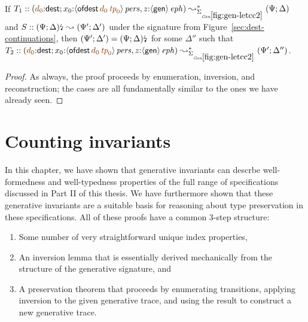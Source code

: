 \bigskip
\begin{theorem} ~
  \label{thm:siggenletcc}
  \smallskip

  If $T_1 :: \left(\lf{d_0}{:}{\sf dest}; x_0{:}\ispers{\susp{{\sf
          ofdest}\,\lf{d_0}\,\lf{{\it tp}_0}}}, z{:}\iseph{\susp{{\sf
          gen}}}\right) \leadsto^*_{\siggenletcc} \left(\Psi; \Delta
  \right)$ and $S :: {\left(\Psi; \Delta\right)}{\mbox{\lightning}}_{}
  \leadsto \left(\Psi'; \Delta'\right)$ under the signature from
  Figure~\ref{sec:dest-continuations}, then $(\Psi'; \Delta') =
  {\left(\Psi; \Delta\right)}{\mbox{\lightning}}_{}$ for some $\Delta''$
  such that $T_2 :: \left(\lf{d_0}{:}{\sf dest}; x_0{:}\ispers{\susp{{\sf
          ofdest}\,\lf{d_0}\,\lf{{\it tp}_0}}}, z{:}\iseph{\susp{{\sf
          gen}}}\right) \leadsto^*_{\siggenletcc} \left(\Psi'; \Delta''
  \right)$.
\end{theorem}

\begin{proof}
  As always, the proof proceeds by enumeration, inversion, and
  reconstruction; the cases are all fundamentally similar to the ones
  we have already seen.
\end{proof}



\section{Counting invariants}
\label{sec:gen-count}

In this chapter, we have shown that generative invariants can descrbe
well-formedness and well-typedness properties of the full range of
specifications discussed in Part II of this thesis. We have
furthermore shown that these generative invariants are a suitable
basis for reasoning about type preservation in these specifications.
All of these proofs have a common 3-step structure: 

\smallskip
\begin{enumerate}
\item Some number of very
straightforward unique index properties, 
\item An inversion lemma that is
essentially derived mechanically from the structure of the generative
signature, and
\item A preservation theorem that proceeds by enumerating transitions,
applying inversion to the given generative trace, and using the result
to construct a new generative trace.
\end{enumerate}
\smallskip

